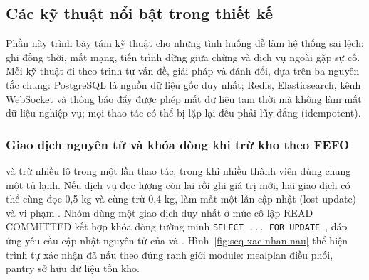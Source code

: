 \subsection{Các kỹ thuật nổi bật trong thiết kế}\label{ssec:ky-thuat}

Phần này trình bày tám kỹ thuật cho những tình huống dễ làm hệ thống sai lệch: ghi đồng thời, mất mạng, tiến trình dừng giữa chừng và dịch vụ ngoài gặp sự cố. Mỗi kỹ thuật đi theo trình tự vấn đề, giải pháp và đánh đổi, dựa trên ba nguyên tắc chung: PostgreSQL là nguồn dữ liệu gốc duy nhất; Redis, Elasticsearch, kênh WebSocket và thông báo đẩy được phép mất dữ liệu tạm thời mà không làm mất dữ liệu nghiệp vụ; mọi thao tác có thể bị lặp lại đều phải lũy đẳng (idempotent).

\subsubsection{Giao dịch nguyên tử và khóa dòng khi trừ kho theo FEFO}\label{sssec:kt-fefo}

 và  trừ nhiều lô trong một lần thao tác, trong khi nhiều thành viên dùng chung một tủ lạnh. Nếu dịch vụ đọc lượng còn lại rồi ghi giá trị mới, hai giao dịch có thể cùng đọc 0,5 kg và cùng trừ 0,4 kg, làm mất một lần cập nhật (lost update) và vi phạm . Nhóm dùng một giao dịch duy nhất ở mức cô lập READ COMMITTED kết hợp khóa dòng tường minh \texttt{SELECT ... FOR UPDATE}~\cite{postgresql}, đáp ứng yêu cầu cập nhật nguyên tử của  và . Hình~\ref{fig:seq-xac-nhan-nau} thể hiện trình tự xác nhận đã nấu theo đúng ranh giới module: mealplan điều phối, pantry sở hữu dữ liệu tồn kho.


